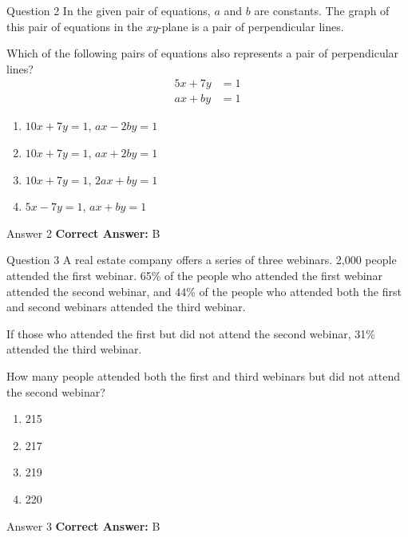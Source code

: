 \documentclass{beamer}
\begin{document}
\begin{frame}{Question 2}
\small
In the given pair of equations, \(a\) and \(b\) are constants. The graph of this pair of equations in the \(xy\)-plane is a pair of perpendicular lines.

Which of the following pairs of equations also represents a pair of perpendicular lines?
\[
\begin{aligned}
5x + 7y &= 1 \\
ax + by &= 1
\end{aligned}
\]
\vspace{0.35cm}
\begin{enumerate}
    \item[A.] \(10x + 7y = 1\), \(ax - 2by = 1\)
    \item[B.] \(10x + 7y = 1\), \(ax + 2by = 1\)
    \item[C.] \(10x + 7y = 1\), \(2ax + by = 1\)
    \item[D.] \(5x - 7y = 1\), \(ax + by = 1\)
\end{enumerate}
\end{frame}
\begin{frame}{Answer 2}
\small
\textbf{Correct Answer:} B
\end{frame}

\begin{frame}{Question 3}
\small
A real estate company offers a series of three webinars. 2,000 people attended the first webinar. 65\% of the people who attended the first webinar attended the second webinar, and 44\% of the people who attended both the first and second webinars attended the third webinar.

If those who attended the first but did not attend the second webinar, 31\% attended the third webinar.

How many people attended both the first and third webinars but did not attend the second webinar?
\vspace{0.35cm}
\begin{enumerate}
    \item[A.] 215
    \item[B.] 217
    \item[C.] 219
    \item[D.] 220
\end{enumerate}
\end{frame}
\begin{frame}{Answer 3}
\small
\textbf{Correct Answer:} B
\end{frame}
\end{document}
